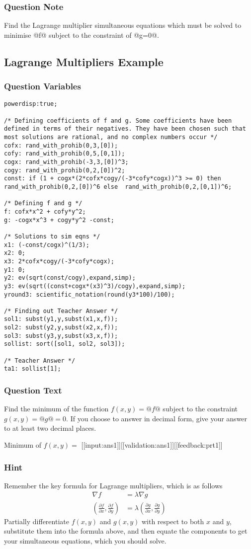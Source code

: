 \documentclass[a4paper,10pt]{article}
\begin{document}
\subsubsection{Question Note}
Find the Lagrange multiplier simultaneous equations which must be solved to minimise @f@ subject to the constraint of @g=0@.

\subsection{Lagrange Multipliers Example}
\subsubsection{Question Variables}
\begin{lstlisting}
powerdisp:true;

/* Defining coefficients of f and g. Some coefficients have been defined in terms of their negatives. They have been chosen such that most solutions are rational, and no complex numbers occur */
cofx: rand_with_prohib(0,3,[0]);
cofy: rand_with_prohib(0,5,[0,1]);
cogx: rand_with_prohib(-3,3,[0])^3;
cogy: rand_with_prohib(0,2,[0])^2;
const: if (1 + cogx*(2*cofx*cogy/(-3*cofy*cogx))^3 >= 0) then rand_with_prohib(0,2,[0])^6 else  rand_with_prohib(0,2,[0,1])^6;

/* Defining f and g */
f: cofx*x^2 + cofy*y^2;
g: -cogx*x^3 + cogy*y^2 -const;

/* Solutions to sim eqns */
x1: (-const/cogx)^(1/3);
x2: 0;
x3: 2*cofx*cogy/(-3*cofy*cogx);
y1: 0;
y2: ev(sqrt(const/cogy),expand,simp);
y3: ev(sqrt((const+cogx*(x3)^3)/cogy),expand,simp);
yround3: scientific_notation(round(y3*100)/100);

/* Finding out Teacher Answer */
sol1: subst(y1,y,subst(x1,x,f));
sol2: subst(y2,y,subst(x2,x,f));
sol3: subst(y3,y,subst(x3,x,f));
sollist: sort([sol1, sol2, sol3]);

/* Teacher Answer */
ta1: sollist[1];
\end{lstlisting}
\subsubsection{Question Text}
Find the minimum of the function \(f(x,y) = @f@\) subject to the constraint \(g(x,y) = @g@ = 0\). If you choose to answer in decimal form, give your answer to at least two decimal places.

Minimum of \(f(x,y) = \) [[input:ans1]][[validation:ans1]][[feedback:prt1]]
\subsubsection{Hint}
Remember the key formula for Lagrange multipliers, which is as follows \begin{align*} \nabla f &= \lambda \nabla g \\ \left(\frac{\partial f}{\partial x},\frac{\partial f}{\partial y} \right) &= \lambda \left( \frac{\partial g}{\partial x}, \frac{\partial g}{\partial y} \right) \end{align*} Partially differentiate $f(x,y)$ and $g(x,y)$ with respect to both $x$ and $y$, substitute them into the formula above, and then equate the components to get your simultaneous equations, which you should solve.
\end{document}
